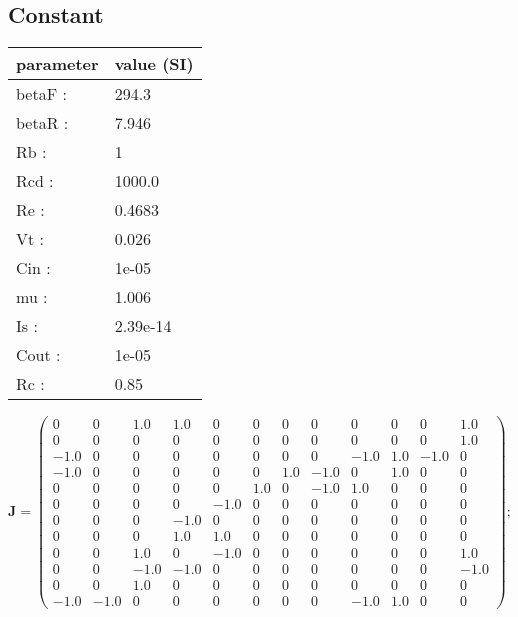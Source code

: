 \documentclass[11pt, oneside]{article}      %
\begin{document}
\subsection{Constant}
%
\begin{center}
%
\begin{tabular}{ll}
%
\hline
parameter & value (SI)
\\ \hline
betaF :& 294.3
\\
betaR :& 7.946
\\
Rb :& 1
\\
Rcd :& 1000.0
\\
Re :& 0.4683
\\
Vt :& 0.026
\\
Cin :& 1e-05
\\
mu :& 1.006
\\
Is :& 2.39e-14
\\
Cout :& 1e-05
\\
Rc :& 0.85
\\
\hline
\end{tabular}
%
\end{center}
%
$ \mathbf{J} = \left(\begin{array}{cccccccccccc}0 & 0 & 1.0 & 1.0 & 0 & 0 & 0 & 0 & 0 & 0 & 0 & 1.0\\0 & 0 & 0 & 0 & 0 & 0 & 0 & 0 & 0 & 0 & 0 & 1.0\\-1.0 & 0 & 0 & 0 & 0 & 0 & 0 & 0 & -1.0 & 1.0 & -1.0 & 0\\-1.0 & 0 & 0 & 0 & 0 & 0 & 1.0 & -1.0 & 0 & 1.0 & 0 & 0\\0 & 0 & 0 & 0 & 0 & 1.0 & 0 & -1.0 & 1.0 & 0 & 0 & 0\\0 & 0 & 0 & 0 & -1.0 & 0 & 0 & 0 & 0 & 0 & 0 & 0\\0 & 0 & 0 & -1.0 & 0 & 0 & 0 & 0 & 0 & 0 & 0 & 0\\0 & 0 & 0 & 1.0 & 1.0 & 0 & 0 & 0 & 0 & 0 & 0 & 0\\0 & 0 & 1.0 & 0 & -1.0 & 0 & 0 & 0 & 0 & 0 & 0 & 1.0\\0 & 0 & -1.0 & -1.0 & 0 & 0 & 0 & 0 & 0 & 0 & 0 & -1.0\\0 & 0 & 1.0 & 0 & 0 & 0 & 0 & 0 & 0 & 0 & 0 & 0\\-1.0 & -1.0 & 0 & 0 & 0 & 0 & 0 & 0 & -1.0 & 1.0 & 0 & 0\end{array}\right) ; $ 
%
\\
%
\end{document}
